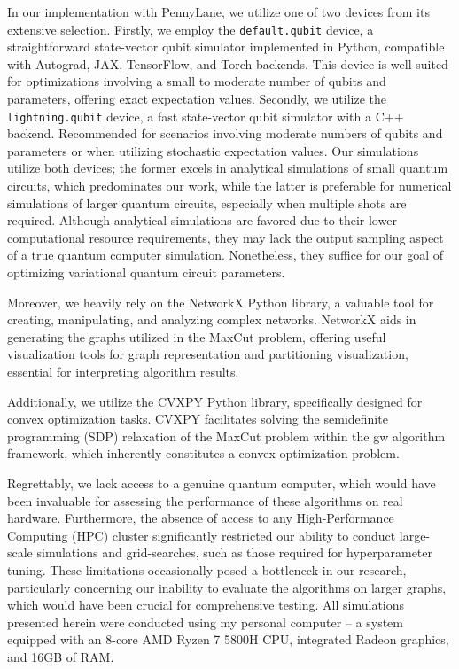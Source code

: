 In our implementation with PennyLane, we utilize one of two devices from its extensive selection. Firstly, we employ the \texttt{default.qubit} device, a straightforward state-vector qubit simulator implemented in Python, compatible with Autograd, JAX, TensorFlow, and Torch backends. This device is well-suited for optimizations involving a small to moderate number of qubits and parameters, offering exact expectation values. Secondly, we utilize the \texttt{lightning.qubit} device, a fast state-vector qubit simulator with a C++ backend. Recommended for scenarios involving moderate numbers of qubits and parameters or when utilizing stochastic expectation values. Our simulations utilize both devices; the former excels in analytical simulations of small quantum circuits, which predominates our work, while the latter is preferable for numerical simulations of larger quantum circuits, especially when multiple shots are required. Although analytical simulations are favored due to their lower computational resource requirements, they may lack the output sampling aspect of a true quantum computer simulation. Nonetheless, they suffice for our goal of optimizing variational quantum circuit parameters.

Moreover, we heavily rely on the NetworkX \cite{NetworkX} Python library, a valuable tool for creating, manipulating, and analyzing complex networks. NetworkX aids in generating the graphs utilized in the MaxCut problem, offering useful visualization tools for graph representation and partitioning visualization, essential for interpreting algorithm results.

Additionally, we utilize the CVXPY \cite{cvxpy} Python library, specifically designed for convex optimization tasks. CVXPY facilitates solving the semidefinite programming (SDP) relaxation of the MaxCut problem within the \acrshort{gw} algorithm framework, which inherently constitutes a convex optimization problem.

Regrettably, we lack access to a genuine quantum computer, which would have been invaluable for assessing the performance of these algorithms on real hardware. Furthermore, the absence of access to any High-Performance Computing (HPC) cluster significantly restricted our ability to conduct large-scale simulations and grid-searches, such as those required for hyperparameter tuning. These limitations occasionally posed a bottleneck in our research, particularly concerning our inability to evaluate the algorithms on larger graphs, which would have been crucial for comprehensive testing. All simulations presented herein were conducted using my personal computer – a system equipped with an 8-core AMD Ryzen 7 5800H CPU, integrated Radeon graphics, and 16GB of RAM.

